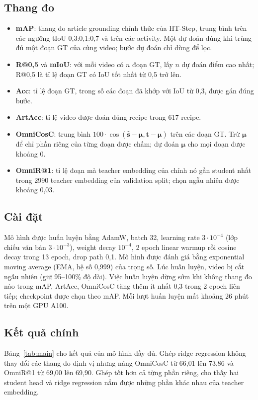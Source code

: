 \documentclass{IEEEtran}
\begin{document}
\subsection{Thang đo}
\begin{itemize}
\item \textbf{mAP}: thang đo article grounding chính thức của HT-Step, trung bình trên các ngưỡng tIoU 0,3:0,1:0,7 và trên các activity. Một dự đoán đúng khi trùng đủ một đoạn GT của cùng video; bước dự đoán chỉ dùng để lọc.
\item \textbf{R@0,5} và \textbf{mIoU}: với mỗi video có $n$ đoạn GT, lấy $n$ dự đoán điểm cao nhất; R@0,5 là tỉ lệ đoạn GT có IoU tốt nhất từ 0,5 trở lên.
\item \textbf{Acc}: tỉ lệ đoạn GT, trong số các đoạn đã khớp với IoU từ 0,3, được gán đúng bước.
\item \textbf{ArtAcc}: tỉ lệ video được đoán đúng recipe trong 617 recipe.
\item \textbf{OmniCosC}: trung bình $100 \cdot \cos(\hat{\mathbf{s}} - \boldsymbol{\mu}, \mathbf{t} - \boldsymbol{\mu})$ trên các đoạn GT. Trừ $\boldsymbol{\mu}$ để chỉ phần riêng của từng đoạn được chấm; dự đoán $\boldsymbol{\mu}$ cho mọi đoạn được khoảng 0.
\item \textbf{OmniR@1}: tỉ lệ đoạn mà teacher embedding của chính nó gần student nhất trong 2990 teacher embedding của validation split; chọn ngẫu nhiên được khoảng 0,03.
\end{itemize}

\subsection{Cài đặt}
Mô hình được huấn luyện bằng AdamW, batch 32, learning rate $3 \cdot 10^{-4}$ (lớp chiếu văn bản $3 \cdot 10^{-3}$), weight decay $10^{-4}$, 2 epoch linear warmup rồi cosine decay trong 13 epoch, drop path 0,1. Mô hình được đánh giá bằng exponential moving average (EMA, hệ số 0,999) của trọng số. Lúc huấn luyện, video bị cắt ngẫu nhiên (giữ 95--100\% độ dài). Việc huấn luyện dừng sớm khi không thang đo nào trong mAP, ArtAcc, OmniCosC tăng thêm ít nhất 0,3 trong 2 epoch liên tiếp; checkpoint được chọn theo mAP. Mỗi lượt huấn luyện mất khoảng 26 phút trên một GPU A100.

\subsection{Kết quả chính}
Bảng~\ref{tab:main} cho kết quả của mô hình đầy đủ. Ghép ridge regression không thay đổi các thang đo định vị nhưng nâng OmniCosC từ 66,01 lên 73,86 và OmniR@1 từ 69,00 lên 69,90. Ghép tốt hơn cả từng phần riêng, cho thấy hai student head và ridge regression nắm được những phần khác nhau của teacher embedding.
\end{document}
